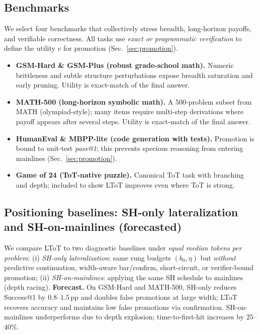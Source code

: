 \documentclass{article}
\begin{document}
\subsection{Benchmarks}
\label{subsec:benchmarks}
We select four benchmarks that collectively stress breadth, long-horizon payoffs, and verifiable correctness.
All tasks use \emph{exact or programmatic verification} to define the utility $v$ for promotion (Sec.~\ref{sec:promotion}).

\begin{itemize}[leftmargin=*, itemsep=2pt, topsep=2pt]
    \item \textbf{GSM-Hard \& GSM-Plus (robust grade-school math).}
    Numeric brittleness and subtle structure perturbations expose breadth saturation and early pruning.
    Utility is exact-match of the final answer.
    \item \textbf{MATH-500 (long-horizon symbolic math).}
    A 500-problem subset from MATH (olympiad-style); many items require multi-step derivations where payoff appears after several steps.
    Utility is exact-match of the final answer.
    \item \textbf{HumanEval \& MBPP-lite (code generation with tests).}
    Promotion is bound to unit-test \emph{pass@1}; this prevents specious reasoning from entering mainlines (Sec.~\ref{sec:promotion}).
    \item \textbf{Game of 24 (ToT-native puzzle).}
    Canonical ToT task with branching and depth; included to show LToT improves even where ToT is strong.
\end{itemize}


\subsection{Positioning baselines: SH-only lateralization and SH-on-mainlines (forecasted)}
\label{subsec:positioning}
We compare LToT to two diagnostic baselines under \emph{equal median tokens per problem}:
(i) \emph{SH-only lateralization}: same rung budgets $(b_0,\eta)$ but \emph{without} predictive continuation, width-aware bar/confirm, short-circuit, or verifier-bound promotion;
(ii) \emph{SH-on-mainlines}: applying the same SH schedule to mainlines (depth racing).
\textbf{Forecast.} On GSM-Hard and MATH-500, SH-only reduces Success@1 by $0.8$--$1.5$\,pp and doubles false promotions at large width;
LToT recovers accuracy and maintains low false promotions via confirmation. SH-on-mainlines underperforms due to depth explosion;
time-to-first-hit increases by $25$--$40$\%.
\end{document}
